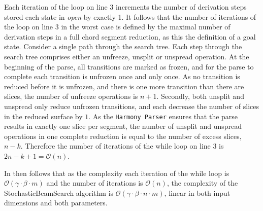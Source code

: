 \documentclass[12pt,a4paper,twoside,openany]{report} \usepackage[pdfborder={0 0 0}]{hyperref}    %
\theoremstyle{definition} \newtheorem{definition}{Definition}[section]
\begin{document}


Each iteration of the loop on line 3 increments the number of derivation steps stored each state in \textit{open} by
exactly 1. It follows that the number of iterations of the loop on line 3 in the worst case is defined by the maximal
number of derivation steps in a full chord segment reduction, as this the definition of a goal state. 
Consider a single path through the search tree. 
Each step through the search tree comprises either an unfreeze, unsplit or unspread operation. At the beginning of the parse, all transitions are marked as frozen, and for the parse to complete each transition is unfrozen once and only once. As no transition is reduced before it is unfrozen, and there is one more transition than there are slices, the number of unfreeze operations is $n+1$. Secondly, both unsplit and unspread only reduce unfrozen transitions, and each decrease the number of slices in the reduced surface by $1$. As the \texttt{Harmony Parser} ensures that the parse
results in exactly one slice per segment, the number of unsplit and unspread operations in one complete reduction is
equal to the number of excess slices, $n-k$. Therefore the number of iterations of the while loop on line 3 is $2n-k+1 = \mathcal{O}(n)$.

In then follows that as the complexity each iteration of the while loop is $\mathcal{O}(\gamma \cdot \beta \cdot m)$ and
the number of iterations is $\mathcal{O}(n)$, the complexity of the StochasticBeamSearch algorithm is
$\mathcal{O}(\gamma \cdot \beta \cdot n \cdot m)$, linear in both input dimensions and both parameters.
\end{document}
